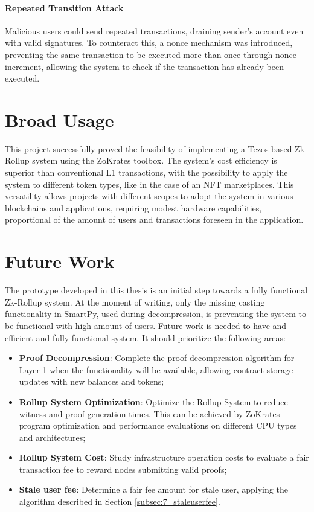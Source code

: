 \paragraph{Repeated Transition Attack} Malicious users could send repeated transactions, draining sender's account even with valid signatures. To counteract this, a nonce mechanism was introduced, preventing the same transaction to be executed more than once through nonce increment, allowing the system to check if the transaction has already been executed.

\section{Broad Usage\label{sec:dissemination}}

This project successfully proved the feasibility of implementing a Tezos-based Zk-Rollup system using the ZoKrates toolbox. The system's cost efficiency is superior than conventional L1 transactions, with the possibility to apply the system to different token types, like in the case of an NFT marketplaces. This versatility allows projects with different scopes to adopt the system in various blockchains and applications, requiring modest hardware capabilities, proportional of the amount of users and transactions foreseen in the application.

\section{Future Work}

The prototype developed in this thesis is an initial step towards a fully functional Zk-Rollup system. At the moment of writing, only the missing casting functionality in SmartPy, used during decompression, is preventing the system to be functional with high amount of users. Future work is needed to have and efficient and fully functional system. It should prioritize the following areas:
\vspace{-0.11in}
\begin{itemize}
	\item \textbf{Proof Decompression}: Complete the proof decompression algorithm for Layer 1 when the functionality will be available, allowing contract storage updates with new balances and tokens;
	      \vspace{-0.11in}
	\item \textbf{Rollup System Optimization}: Optimize the Rollup System to reduce witness and proof generation times. This can be achieved by ZoKrates program optimization and performance evaluations on different CPU types and architectures;
	      \vspace{-0.11in}
	\item \textbf{Rollup System Cost}: Study infrastructure operation costs to evaluate a fair transaction fee to reward nodes submitting valid proofs;
	      \vspace{-0.11in}
	\item \textbf{Stale user fee}: Determine a fair fee amount for stale user, applying the algorithm described in Section \ref{subsec:7_staleuserfee}.
	\vspace{-0.11in}
\end{itemize}
